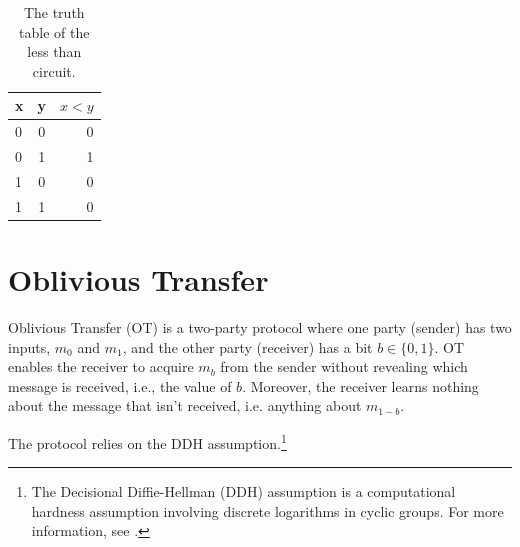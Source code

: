 \begin{table}[h]
\label{tab:less_than}
\centering
\begin{tabular}{ | l | c || r |}
\hline
x & y & $x < y$ \\ \hline
0 & 0 & 0 \\ \hline
0 & 1 & 1 \\ \hline
1 & 0 & 0 \\ \hline
1 & 1 & 0 \\ \hline
\end{tabular}
\caption{The truth table of the less than circuit.}
\end{table}

\section{Oblivious Transfer}
Oblivious Transfer (OT) is a two-party protocol where one party (sender) has two inputs, $m_0$ and $m_1$, and the other party (receiver) has a bit $b \in \{0,1\}$. 
OT enables the receiver to acquire $m_b$ from the sender without revealing which message is received, i.e., the value of $b$.
Moreover, the receiver learns nothing about the message that isn't received, i.e. anything about $m_{1-b}$.

The protocol relies on the DDH assumption.\footnote{The Decisional Diffie-Hellman (DDH) assumption is a computational hardness assumption involving discrete logarithms in cyclic groups. For more information, see \cite{Boneh1998}.}


